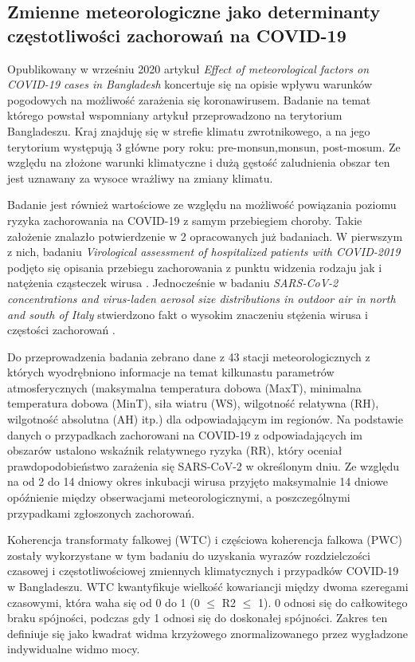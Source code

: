 \documentclass[polish, twoside, 12pt, a4paper]{article}
\theoremstyle{definition}
\theoremstyle{plain}
\theoremstyle{remark}
\begin{document}
\subsection{Zmienne meteorologiczne jako determinanty częstotliwości zachorowań na COVID-19}

Opublikowany w wrześniu 2020 artykuł \emph{Effect of meteorological factors on COVID-19 cases in Bangladesh} koncertuje się na opisie wpływu warunków pogodowych na możliwość zarażenia się koronawirusem. Badanie na temat którego powstał wspomniany artykuł przeprowadzono na terytorium Bangladeszu. Kraj znajduję się w strefie klimatu zwrotnikowego, a na jego terytorium występują 3 główne pory roku: pre-monsun,monsun, post-mosum. Ze względu na złożone warunki klimatyczne i dużą gęstość zaludnienia obszar ten jest uznawany za wysoce wrażliwy na zmiany klimatu.


Badanie jest również wartościowe ze względu na możliwość powiązania poziomu ryzyka zachorowania na COVID-19 z samym przebiegiem choroby. Takie założenie znalazło potwierdzenie w 2 opracowanych już badaniach. W pierwszym z nich,  badaniu \emph{Virological assessment of hospitalized patients with COVID-2019} podjęto się opisania przebiegu zachorowania z punktu widzenia rodzaju jak i natężenia cząsteczek wirusa \cite{wolfel2020}. Jednocześnie w badaniu \emph{SARS-CoV-2 concentrations and virus-laden aerosol size distributions in outdoor air in north and south of Italy} stwierdzono fakt o wysokim znaczeniu stężenia wirusa i częstości zachorowań \cite{chirizzi2020}.

Do przeprowadzenia badania zebrano dane z 43 stacji meteorologicznych z których wyodrębniono informacje na temat kilkunastu parametrów atmosferycznych (maksymalna temperatura dobowa (MaxT), minimalna temperatura dobowa (MinT), siła wiatru (WS), wilgotność relatywna (RH), wilgotność absolutna (AH) itp.) dla odpowiadającym im regionów. Na podstawie danych o przypadkach zachorowani na COVID-19 z odpowiadających im obszarów ustalono wskaźnik relatywnego ryzyka (RR), który oceniał prawdopodobieństwo zarażenia się SARS-CoV-2 w określonym dniu. Ze względu na od 2 do 14 dniowy okres inkubacji wirusa przyjęto maksymalnie 14 dniowe opóźnienie między obserwacjami meteorologicznymi, a poszczególnymi przypadkami zgłoszonych zachorowań.

Koherencja transformaty falkowej (WTC) i częściowa koherencja falkowa (PWC) zostały wykorzystane w tym badaniu do uzyskania wyrazów rozdzielczości czasowej i częstotliwościowej zmiennych klimatycznych i przypadków COVID-19 w Bangladeszu. WTC kwantyfikuje wielkość kowariancji między dwoma szeregami czasowymi, która waha się od 0 do 1 (0 $\leq$ R2 $\leq$ 1). 0 odnosi się do całkowitego braku spójności, podczas gdy 1 odnosi się do doskonałej spójności. Zakres ten definiuje się jako kwadrat widma krzyżowego znormalizowanego przez wygładzone indywidualne widmo mocy. 
\end{document}
